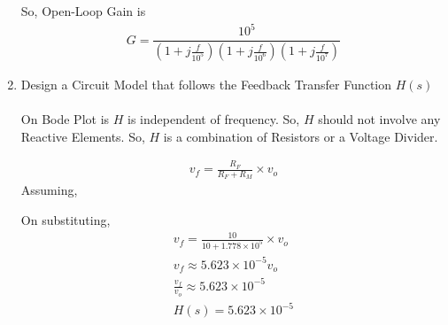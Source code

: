 \begin{enumerate}[label=\thesection.\arabic*.,ref=\thesection.\theenumi]
So, Open-Loop Gain is
\begin{align}
G = \dfrac{10^5}{\left(1+j\frac{f}{10^{5}}\right)\left(1+j\frac{f}{10^{6}}\right)\left(1+j\frac{f}{10^{7}}\right)}
\end{align}%
\item Design a Circuit Model that follows the Feedback Transfer Function $H(s)$\\
\solution\\
On Bode Plot is $H$ is independent of frequency. So, $H$  should not involve any Reactive Elements. So, $H$ is a combination of Resistors or a Voltage Divider.
\begin{figure}[ht!]
	\begin{center}
		\resizebox{\columnwidth/2}{!}{}
	\end{center}
	\caption{}
	\label{fig:ee18btech11014_Feedback Circuit}
\end{figure}
\begin{align}
v_{f} = \frac{R_{F}}{R_{F} + R_{M}} \times v_{o}
\end{align}
Assuming,
\begin{table}[!ht]
\centering

\caption{}
\label{table:table1}
\end{table}

On substituting,
\begin{align}
v_{f} = \frac{10}{10 + 1.778\times 10^{5}} \times v_{o}\\
v_{f} \approx 5.623\times 10^{-5} v_{o}\\
\frac{v_{f}}{v_{o}} \approx 5.623\times 10^{-5}\\
H(s) = 5.623\times 10^{-5}
\end{align}


\end{enumerate}
